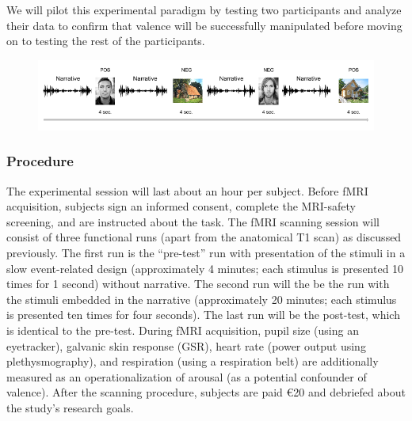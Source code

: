 \documentclass[12pt,a4paper]{article}\usepackage[]{graphicx}\usepackage[]{color}
\begin{document}
We will pilot this experimental paradigm by testing two participants and analyze their data to confirm that valence will be successfully manipulated before moving on to testing the rest of the participants.

\begin{figure}[h]
\centering
\includegraphics[scale=.55]{exp_paradigm}
\end{figure}

\subsubsection{Procedure}
The experimental session will last about an hour per subject. Before fMRI acquisition, subjects sign an informed consent, complete the MRI-safety screening, and are instructed about the task. The fMRI scanning session will consist of three functional runs (apart from the anatomical T1 scan) as discussed previously. The first run is the ``pre-test'' run with presentation of the stimuli in a slow event-related design (approximately 4 minutes; each stimulus is presented 10 times for 1 second) without narrative. The second run will the be the run with the stimuli embedded in the narrative (approximately 20 minutes; each stimulus is presented ten times for four seconds). The last run will be the post-test, which is identical to the pre-test. During fMRI acquisition, pupil size (using an eyetracker), galvanic skin response (GSR), heart rate (power output using plethysmography), and respiration (using a respiration belt) are additionally measured as an operationalization of arousal (as a potential confounder of valence). After the scanning procedure, subjects are paid \euro 20 and debriefed about the study's research goals. 
\end{document}
